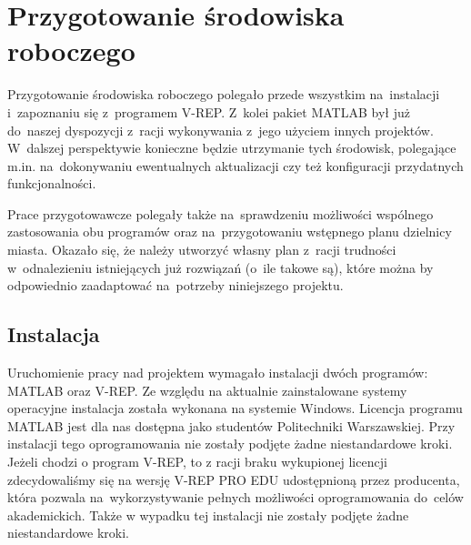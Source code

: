 \documentclass[11pt, a4paper, twoside]{article}
\begin{document}
	\section{Przygotowanie środowiska roboczego}
	\label{sec:przygotowanie}
	Przygotowanie środowiska roboczego polegało przede wszystkim na~instalacji i~zapoznaniu się z~programem V-REP. Z~kolei pakiet MATLAB był już do~naszej dyspozycji z~racji wykonywania z~jego użyciem innych projektów. W~dalszej perspektywie konieczne będzie utrzymanie tych środowisk,  polegające m.in. na~dokonywaniu ewentualnych aktualizacji czy też konfiguracji przydatnych funkcjonalności.
	
	Prace przygotowawcze polegały także na~sprawdzeniu możliwości wspólnego zastosowania obu programów oraz na~przygotowaniu wstępnego planu dzielnicy miasta. Okazało się, że należy utworzyć własny plan z~racji trudności w~odnalezieniu istniejących już rozwiązań (o~ile takowe są), które można by odpowiednio zaadaptować na~potrzeby niniejszego projektu.
	
	\subsection{Instalacja}
	\label{subsec:instalacja}
	Uruchomienie pracy nad projektem wymagało instalacji dwóch programów: MATLAB oraz \mbox{V-REP}. Ze względu na aktualnie zainstalowane systemy operacyjne instalacja została wykonana na systemie Windows. Licencja programu MATLAB jest dla nas dostępna jako studentów Politechniki Warszawskiej. Przy instalacji tego oprogramowania nie zostały podjęte żadne niestandardowe kroki. Jeżeli chodzi o program V-REP, to z racji braku wykupionej licencji zdecydowaliśmy się na wersję V-REP PRO EDU udostępnioną przez producenta, która pozwala na~wykorzystywanie pełnych możliwości oprogramowania do~celów akademickich. Także w wypadku tej instalacji nie zostały podjęte żadne niestandardowe kroki.
	
\end{document}
